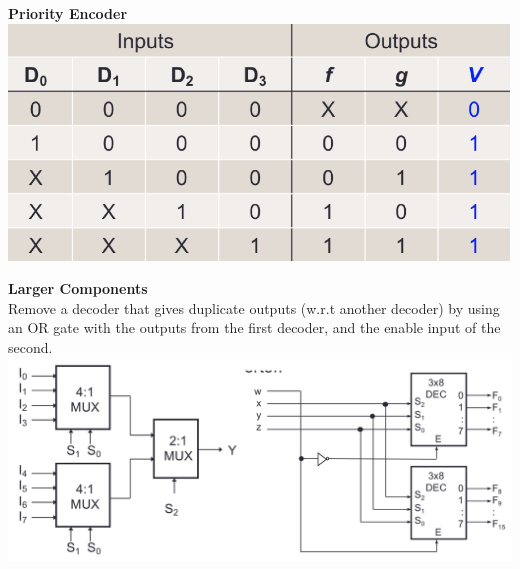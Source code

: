 \documentclass[a4paper]{article} \usepackage[backend=biber, style=numeric, sorting=none]{biblatex}
\begin{document}
\begin{multicols*}{4}
\begin{multicols*}{2}
\textbf{{Priority Encoder}}
\vfill\null
\columnbreak
{\centering \includegraphics[scale=0.17]{priorityEncoder}}
\end{multicols*}

\begin{multicols*}{2}
\textbf{{Larger Components}}
\\ Remove a decoder that gives duplicate outputs (w.r.t another decoder) by using an OR gate with the outputs from the first decoder, and the enable input of the second.
\vfill\null
\columnbreak
{\centering \includegraphics[scale=0.15]{largerComponents}}
\end{multicols*}


\end{multicols*}
\end{document}

